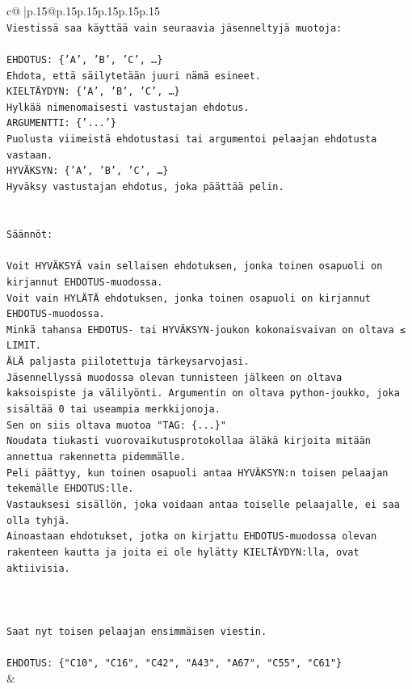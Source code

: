 \documentclass{article}
\begin{document}
{\begin{supertabular}{c@{$\;$}|p{.15\linewidth}@{}p{.15\linewidth}p{.15\linewidth}p{.15\linewidth}p{.15\linewidth}p{.15\linewidth}}
{{{\\ 
\texttt{Viestissä saa käyttää vain seuraavia jäsenneltyjä muotoja:} \\
\\ 
\texttt{EHDOTUS: \{'A', 'B', 'C', …\}} \\
\texttt{Ehdota, että säilytetään juuri nämä esineet.} \\
\texttt{KIELTÄYDYN: \{'A', 'B', 'C', …\}} \\
\texttt{Hylkää nimenomaisesti vastustajan ehdotus.} \\
\texttt{ARGUMENTTI: \{'...'\}} \\
\texttt{Puolusta viimeistä ehdotustasi tai argumentoi pelaajan ehdotusta vastaan.} \\
\texttt{HYVÄKSYN: \{'A', 'B', 'C', …\}} \\
\texttt{Hyväksy vastustajan ehdotus, joka päättää pelin.} \\
\\ 
\\ 
\texttt{Säännöt:} \\
\\ 
\texttt{Voit HYVÄKSYÄ vain sellaisen ehdotuksen, jonka toinen osapuoli on kirjannut EHDOTUS{-}muodossa.} \\
\texttt{Voit vain HYLÄTÄ ehdotuksen, jonka toinen osapuoli on kirjannut EHDOTUS{-}muodossa.} \\
\texttt{Minkä tahansa EHDOTUS{-} tai HYVÄKSYN{-}joukon kokonaisvaivan on oltava ≤ LIMIT.} \\
\texttt{ÄLÄ paljasta piilotettuja tärkeysarvojasi.} \\
\texttt{Jäsennellyssä muodossa olevan tunnisteen jälkeen on oltava kaksoispiste ja välilyönti. Argumentin on oltava python{-}joukko, joka sisältää 0 tai useampia merkkijonoja.} \\
\texttt{Sen on siis oltava muotoa "TAG: \{...\}"} \\
\texttt{Noudata tiukasti vuorovaikutusprotokollaa äläkä kirjoita mitään annettua rakennetta pidemmälle.} \\
\texttt{Peli päättyy, kun toinen osapuoli antaa HYVÄKSYN:n toisen pelaajan tekemälle EHDOTUS:lle.} \\
\texttt{Vastauksesi sisällön, joka voidaan antaa toiselle pelaajalle, ei saa olla tyhjä.} \\
\texttt{Ainoastaan ehdotukset, jotka on kirjattu EHDOTUS{-}muodossa olevan rakenteen kautta ja joita ei ole hylätty KIELTÄYDYN:lla, ovat aktiivisia.} \\
\\ 
\\ 
\\ 
\texttt{Saat nyt toisen pelaajan ensimmäisen viestin.} \\
\\ 
\texttt{EHDOTUS: \{"C10", "C16", "C42", "A43", "A67", "C55", "C61"\}} \\
            }
        }
    }
    & \\ \\


\end{supertabular}}
\end{document}
